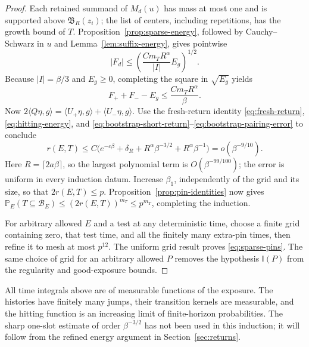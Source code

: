 \begin{proof}
Each retained summand of \(M_d(u)\) has mass at most one and
is supported above \(\mathfrak B_R(z_i)\); the list of centers,
including repetitions, has the growth bound of \(T\).
Proposition~\ref{prop:sparse-energy}, followed by Cauchy--Schwarz
in \(u\) and Lemma~\ref{lem:suffix-energy}, gives pointwise
\[
 |F_d|\le
 \left(\frac{Cm_TR^\alpha}{|I|}E_g\right)^{1/2}.
\]
Because \(|I|=\beta/3\) and \(E_g\ge0\), completing the square
in \(\sqrt{E_g}\) yields
\[
 F_++F_--E_g\le\frac{C m_T R^\alpha}{\beta}.
\]
Now \(2\langle Q\eta,g\rangle
=\langle U_+\eta,g\rangle+\langle U_-\eta,g\rangle\).
Use the fresh-return identity \eqref{eq:fresh-return},
\eqref{eq:hitting-energy}, and
\eqref{eq:bootstrap-short-return}--\eqref{eq:bootstrap-pairing-error}
to conclude
\begin{equation}\label{eq:bootstrap-return}
 r(E,T)\le C\bigl(e^{-c\beta}+\delta_R
              +R^\alpha\beta^{-3/2}+R^\alpha\beta^{-1}\bigr)
 =o(\beta^{-9/10}).
\end{equation}
Here \(R=\lceil2a\beta\rceil\), so the largest polynomial
term is \(O(\beta^{-99/100})\); the error is uniform in every
induction datum.  Increase \(\beta_1\), independently of the
grid and its size, so that \(2r(E,T)\le p\).
Proposition~\ref{prop:pin-identities} now gives
\(\mathbb P_E(T\subseteq\mathcal B_E)\le(2r(E,T))^{m_T}
\le p^{m_T}\), completing the induction.

For arbitrary allowed \(E\) and a test at any deterministic time,
choose a finite grid containing zero, that test time, and all the
finitely many extra-pin times, then refine it to mesh at most
\(p^{12}\).  The uniform grid result proves
\eqref{eq:sparse-pins}.  The same choice of grid for an arbitrary
allowed \(P\) removes the hypothesis \(\mathsf I(P)\) from the
regularity and good-exposure bounds.
\end{proof}

All time integrals above are of measurable functions of the exposure.
The histories have finitely many jumps, their transition kernels are
measurable, and the hitting function is an increasing limit of
finite-horizon probabilities.  The sharp one-slot estimate of order \(\beta^{-3/2}\) has not been
used in this induction; it will follow from the refined energy
argument in Section~\ref{sec:returns}.
